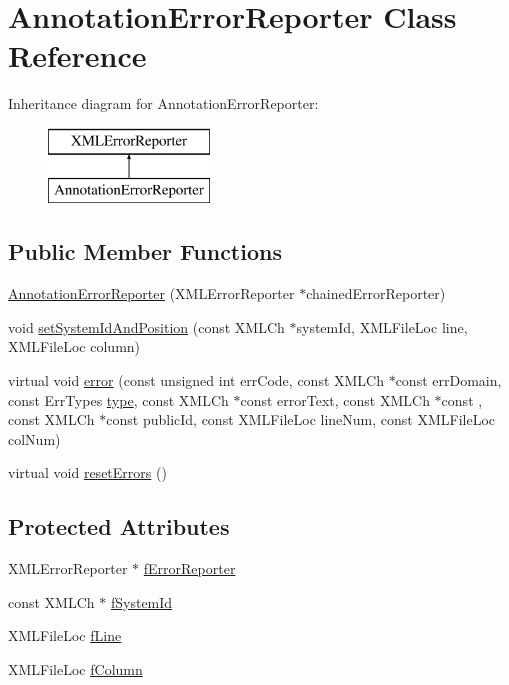 \hypertarget{classAnnotationErrorReporter}{\section{Annotation\-Error\-Reporter Class Reference}
\label{classAnnotationErrorReporter}
}
Inheritance diagram for Annotation\-Error\-Reporter\-:\begin{figure}[H]
\begin{center}
\leavevmode
\includegraphics[height=2.000000cm]{classAnnotationErrorReporter}
\end{center}
\end{figure}
\subsection*{Public Member Functions}
\begin{DoxyCompactItemize}
\item 
\hyperlink{classAnnotationErrorReporter_ab7a68db7eba3461848427d4a53ea22bb}{Annotation\-Error\-Reporter} (X\-M\-L\-Error\-Reporter $\ast$chained\-Error\-Reporter)
\item 
void \hyperlink{classAnnotationErrorReporter_aaed46c31d779ef173ad38b3d40d04d95}{set\-System\-Id\-And\-Position} (const X\-M\-L\-Ch $\ast$system\-Id, X\-M\-L\-File\-Loc line, X\-M\-L\-File\-Loc column)
\item 
virtual void \hyperlink{classAnnotationErrorReporter_acbf4fc9ac0c79da6e6744e5684960ed1}{error} (const unsigned int err\-Code, const X\-M\-L\-Ch $\ast$const err\-Domain, const Err\-Types \hyperlink{classtype}{type}, const X\-M\-L\-Ch $\ast$const error\-Text, const X\-M\-L\-Ch $\ast$const , const X\-M\-L\-Ch $\ast$const public\-Id, const X\-M\-L\-File\-Loc line\-Num, const X\-M\-L\-File\-Loc col\-Num)
\item 
virtual void \hyperlink{classAnnotationErrorReporter_a81a18f5b4c94bb9e3be122ca802454de}{reset\-Errors} ()
\end{DoxyCompactItemize}
\subsection*{Protected Attributes}
\begin{DoxyCompactItemize}
\item 
X\-M\-L\-Error\-Reporter $\ast$ \hyperlink{classAnnotationErrorReporter_a15d1d4e1b7ed000e1703c876021aed6e}{f\-Error\-Reporter}
\item 
const X\-M\-L\-Ch $\ast$ \hyperlink{classAnnotationErrorReporter_a3525f2b182105757e85509f8ce78daac}{f\-System\-Id}
\item 
X\-M\-L\-File\-Loc \hyperlink{classAnnotationErrorReporter_a8a861fd734bc340d819b1e8f4ea0a31c}{f\-Line}
\item 
X\-M\-L\-File\-Loc \hyperlink{classAnnotationErrorReporter_a3e5c976170b1062bd2c86caa7e5c531e}{f\-Column}
\end{DoxyCompactItemize}


